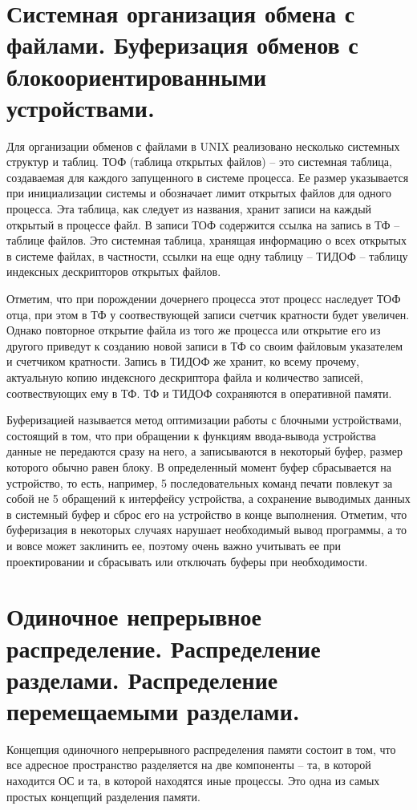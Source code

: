 \documentclass[a4paper,12pt,titlepage,finall]{article}
\begin{document}
\section{Системная организация обмена с файлами. Буферизация обменов
с блокоориентированными устройствами.}
Для организации обменов с файлами в UNIX реализовано несколько системных структур и таблиц. ТОФ (таблица открытых файлов) -- это системная таблица, создаваемая для каждого запущенного в системе процесса. Ее размер указывается при инициализации системы и обозначает лимит открытых файлов для одного процесса. Эта таблица, как следует из названия, хранит записи на каждый открытый в процессе файл. В записи ТОФ содержится ссылка на запись в ТФ -- таблице файлов. Это системная таблица, хранящая информацию о всех открытых в системе файлах, в частности, ссылки на еще одну таблицу -- ТИДОФ -- таблицу индексных дескрипторов открытых файлов.

Отметим, что при порождении дочернего процесса этот процесс наследует ТОФ отца, при этом в ТФ у соотвествующей записи счетчик кратности будет увеличен. Однако повторное открытие файла из того же процесса или открытие его из другого приведут к созданию новой записи в ТФ со своим файловым указателем и счетчиком кратности. Запись в ТИДОФ же хранит, ко всему прочему, актуальную копию индексного дескриптора файла и количество записей, соотвествующих ему в ТФ. ТФ и ТИДОФ сохраняются в оперативной памяти.

Буферизацией называется метод оптимизации работы с блочными устройствами, состоящий в том, что при обращении к функциям ввода-вывода устройства данные не передаются сразу на него, а записываются в некоторый буфер, размер которого обычно равен блоку. В определенный момент буфер сбрасывается на устройство, то есть, например, 5 последовательных команд печати повлекут за собой не 5 обращений к интерфейсу устройства, а сохранение выводимых данных в системный буфер и сброс его на устройство в конце выполнения. Отметим, что буферизация в некоторых случаях нарушает необходимый вывод программы, а то и вовсе может заклинить ее, поэтому очень важно учитывать ее при проектировании и сбрасывать или отключать буферы при необходимости.

\section{Одиночное непрерывное распределение. Распределение
разделами. Распределение перемещаемыми разделами.}
Концепция одиночного непрерывного распределения памяти состоит в том, что все адресное пространство разделяется на две компоненты -- та, в которой находится ОС и та, в которой находятся иные процессы. Это одна из самых простых концепций разделения памяти.
\end{document}
